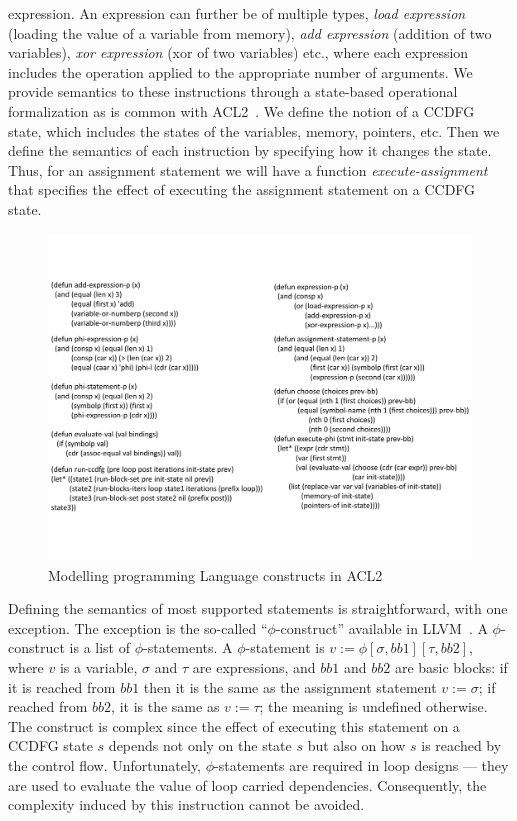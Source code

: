 expression. An expression can further be of multiple types, %
{\em load expression} (loading the value of a variable from memory), {\em add
expression} (addition of two variables), {\em xor expression} (xor of two variables)
etc., where each expression includes the operation applied to the
appropriate number of arguments. We provide semantics to these instructions through a
state-based operational formalization as is common with
ACL2~\cite{liu}. We define the notion of a CCDFG state, which includes
the states of the variables, memory, pointers, etc.  Then we
define the semantics of each instruction by specifying how
it changes the state.  Thus, for an assignment statement we
will have a function {\em execute-assignment} that specifies
the effect of executing the assignment statement on a CCDFG
state.

\begin{figure}
\begin{center}
\includegraphics[width=4.5in]{fig-proposal/formalization1}
\end{center}
\caption{Modelling programming Language constructs in ACL2}
\label{fig:syntax}
\end{figure}

Defining the semantics of most supported statements is straightforward, with one exception.  The exception is the so-called ``$\phi$-construct'' available in LLVM~\cite{llvmphi}.  A $\phi$-construct is a list of $\phi$-statements.  A $\phi$-statement is $v := \phi [\sigma, bb1] [\tau, bb2]$, where $v$ is a variable, $\sigma$ and $\tau$ are expressions, and $bb1$ and $bb2$ are basic blocks: if it is reached from $bb1$ then it is the same as the assignment statement $v := \sigma$; if reached from $bb2$, it is the same as $v := \tau$; the meaning is undefined otherwise. The construct is complex since the effect of executing this statement on a CCDFG state $s$ depends not only on the state $s$ but also on how $s$ is reached by the control flow. Unfortunately, $\phi$-statements are required in loop designs --- they are used to evaluate the value of loop carried dependencies. Consequently, the complexity induced by this instruction cannot be avoided. 


